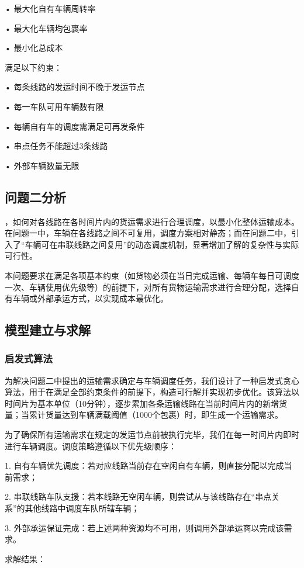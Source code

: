 \documentclass{MMCStyle}
\begin{document}
	•	最大化自有车辆周转率
 
	•	最大化车辆均包裹率
 
	•	最小化总成本

满足以下约束：

	•	每条线路的发运时间不晚于发运节点

    •	每一车队可用车辆数有限
 
	•	每辆自有车的调度需满足可再发条件
 
	•	串点任务不能超过3条线路
 
	•	外部车辆数量无限
 
\subsection{问题二分析}
，如何对各线路在各时间片内的货运需求进行合理调度，以最小化整体运输成本。在问题一中，车辆在各线路之间不可复用，调度方案相对静态；而在问题二中，引入了“车辆可在串联线路之间复用”的动态调度机制，显著增加了解的复杂性与实际可行性。

本问题要求在满足各项基本约束（如货物必须在当日完成运输、每辆车每日可调度一次、车辆使用优先级等）的前提下，对所有货物运输需求进行合理分配，选择自有车辆或外部承运方式，以实现成本最优化。
\subsection{模型建立与求解}
\subsubsection{启发式算法}

为解决问题二中提出的运输需求确定与车辆调度任务，我们设计了一种启发式贪心算法，用于在满足全部约束条件的前提下，构造可行解并实现初步优化。该算法以时间片为基本单位（10分钟），逐步累加各条运输线路在当前时间片内的新增货量；当累计货量达到车辆满载阈值（1000个包裹）时，即生成一个运输需求。

为了确保所有运输需求在规定的发运节点前被执行完毕，我们在每一时间片内即时进行车辆调度。调度策略遵循以下优先级顺序：

1.	自有车辆优先调度：若对应线路当前存在空闲自有车辆，则直接分配以完成当前需求；

2.	串联线路车队支援：若本线路无空闲车辆，则尝试从与该线路存在“串点关系”的其他线路中调度车队所辖车辆；

3.	外部承运保证完成：若上述两种资源均不可用，则调用外部承运商以完成该需求。

求解结果：
\end{document}
